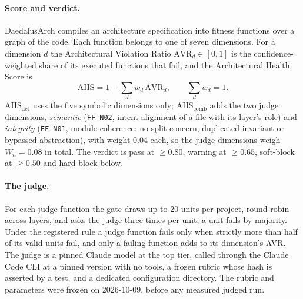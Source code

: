 \documentclass[10pt,a4paper]{article}
\newcommand{\tool}{DaedalusArch}
\newcommand{\ff}[1]{\texttt{\small #1}}
\newcommand{\Wn}{W_n}
\newcommand{\ahs}[1]{\mathrm{AHS}_{\mathrm{#1}}}
\begin{document}
\paragraph{Score and verdict.}
\tool{} compiles an architecture specification into fitness functions over a graph of the code. Each function
belongs to one of seven dimensions. For a dimension $d$ the Architectural Violation Ratio $\mathrm{AVR}_d \in [0,1]$
is the confidence-weighted share of its executed functions that fail, and the Architectural Health Score is
\begin{equation}\label{eq:ahs}
  \mathrm{AHS} = 1 - \sum_d w_d\, \mathrm{AVR}_d, \qquad \textstyle\sum_d w_d = 1 .
\end{equation}
$\ahs{det}$ uses the five symbolic dimensions only; $\ahs{comb}$ adds the two judge dimensions, \emph{semantic}
(\ff{FF-N02}, intent alignment of a file with its layer's role) and \emph{integrity} (\ff{FF-N01}, module coherence:
no split concern, duplicated invariant or bypassed abstraction), with weight 0.04 each, so the judge dimensions weigh
$\Wn = 0.08$ in total.
The verdict is pass at $\geq 0.80$, warning at $\geq 0.65$, soft-block at $\geq 0.50$ and hard-block below.

\paragraph{The judge.}
For each judge function the gate draws up to 20 units per project, round-robin across layers, and asks the judge
three times per unit; a unit fails by majority. Under the registered rule a judge function fails only when strictly
more than half of its valid units fail, and only a failing function adds to its dimension's AVR.
The judge is a pinned Claude model at the top tier, called through the Claude Code CLI at a pinned version with no
tools, a frozen rubric whose hash is asserted by a test, and a dedicated configuration directory.
The rubric and parameters were frozen on 2026-10-09, before any measured judged run.
\end{document}
